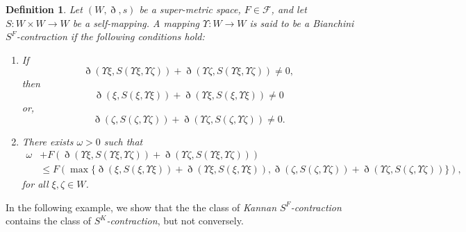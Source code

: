 \documentclass[pdflatex,sn-mathphys-num]{sn-jnl}%
\theoremstyle{thmstyleone}%
\theoremstyle{thmstyletwo}%
\theoremstyle{thmstylethree}%
\newtheorem{definition}{Definition}%
\begin{document}
\begin{definition}\label{bsf definition}
Let $(W,\eth,s)$ be a super-metric space, $F \in \mathcal{F}$, and let 
$S : W \times W \to W$ be a self-mapping. A mapping $\Upsilon  : W \to W$ 
is said to be a \emph{\textit{Bianchini $S^F$-contraction}} if the following conditions hold:
\begin{enumerate}
    \item[(i)] 
    If 
    \[
    \eth(\Upsilon \xi,S(\Upsilon \xi,\Upsilon \zeta)) + \eth(\Upsilon \zeta,S(\Upsilon \xi,\Upsilon \zeta)) \neq 0,
    \]
    then
    \[
    \eth(\xi,S(\xi,\Upsilon \xi )) + \eth(\Upsilon \xi,S(\xi,\Upsilon \xi )) \neq 0
    \]
    or,
    \[
    \eth(\zeta ,S(\zeta,\Upsilon \zeta)) + \eth(\Upsilon \zeta,S(\zeta,\Upsilon \zeta)) \neq 0.
    \]

    \item[(ii)] 
    There exists $\omega   > 0$ such that
    \begin{equation}\label{bsf contraction}
    \begin{aligned}
    \omega  & + F(\eth(\Upsilon \xi, S(\Upsilon \xi,\Upsilon \zeta)) + \eth(\Upsilon \zeta, S(\Upsilon \xi,\Upsilon \zeta))) \\
    &\le 
    F\left(
    \max\{
    \eth(\xi,S(\xi,\Upsilon \xi )) + \eth(\Upsilon \xi,S(\xi,\Upsilon \xi )) 
    , \eth(\zeta ,S(\zeta,\Upsilon \zeta)) + \eth(\Upsilon \zeta,S(\zeta,\Upsilon \zeta))\}\right),
    \end{aligned}
    \end{equation}
    for all $\xi,\zeta \in W$.
\end{enumerate}
\end{definition}

In the following example, we show that the the class of \textit{Kannan $S^F$-contraction} contains the class of \textit{$S^K$-contraction}, but not conversely.
\end{document}
